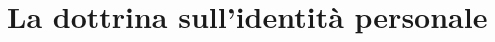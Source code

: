 \section{La dottrina sull'identità personale}
\begin{comment}La complessità nella classificazione del diritto all'identità personale, a livello giuridico e filosofico, deriva dal criterio stesso di identità.
\\Analizzando all'origine la persona stessa, alcuni studiosi si sono chiesti perfino come sia possibile classificare uno stesso individuo in periodi diversi della propria vita, proprio a causa della mutevolezza che caratterizza l'essere umano.
Orientamenti naturalistici – referente più autorevole in Aristotele, l’identità di una persona è data dalla sua piena continuità fisica, intesa come continuità se non di tutto il corpo, quantomeno di quella parte essenziale che è sufficiente a classificarlo come individuo senziente, vivente, razionale, ossia il CERVELLO.
Orientamenti cognitivi – John Locke afferma che l’identità personale consiste nel ciclo unità coscienza/continuità dell’individuo, di riflettere e attribuire a se azioni e pensieri. Ruolo fondamentale secondo questa teoria è la memoria delle proprie azioni passate, costituendo una sorta di proprietà privata di ciascun individuo. Le azioni di cui non ho ricordo perché incosciente o drogato, non fanno parte della mia identità personale in quanto non mi appartengono e non possono essermi imputati.
Orientamenti anti-identitisti – David Hume – l’identità è un’illusione necessaria al nostro bisogno di stabilità e sicurezza. Idea ripresa da Derek Parfit, che afferma che l’identità è una questione di grado: fra le due ipotesi  estreme della completa continuità e del venire meno di ogni rapporto con l’identità passata sono configurabili infinite ipotesi intermedie, nelle quali è impossibile definire se un’identità vi sia o no. Parfit sostiene quindi che è un concetto legato alla connessione più che alla continuità (es. mucchio di sabbia: togliendo un granello alla volta, dopo quanti siamo disposti a dire che quello non è più lo stesso mucchio di sabbia?) pertanto l’identità sarebbe un legame parziale fra i diversi stati fisici e mentali di un individuo. La paradossale conclusione è che il rapporto fra il me di oggi e quello di domani potrebbe essere lo stesso fra il me di oggi e qualsiasi altra persona.
A livello giuridico le definizione di identità personale implica una ricostruzione della verità del soggetto quale si è estrinsecata nella realtà sociale e che è suscettibile di essere ricostruita tramite gli ordinari strumenti probatori.\end{comment}

